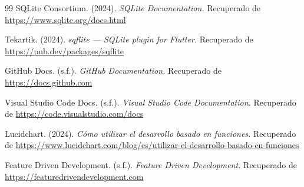 \begin{thebibliography}{99}
SQLite Consortium. (2024). \textit{SQLite Documentation.} Recuperado de \url{https://www.sqlite.org/docs.html}

Tekartik. (2024). \textit{sqflite — SQLite plugin for Flutter.} Recuperado de \url{https://pub.dev/packages/sqflite}

GitHub Docs. (s.f.). \textit{GitHub Documentation.} Recuperado de \url{https://docs.github.com}

Visual Studio Code Docs. (s.f.). \textit{Visual Studio Code Documentation.} Recuperado de \url{https://code.visualstudio.com/docs}


Lucidchart. (2024). \textit{Cómo utilizar el desarrollo basado en funciones.} Recuperado de \url{https://www.lucidchart.com/blog/es/utilizar-el-desarrollo-basado-en-funciones}

Feature Driven Development. (s.f.). \textit{Feature Driven Development.} Recuperado de \url{https://featuredrivendevelopment.com}

\end{thebibliography}